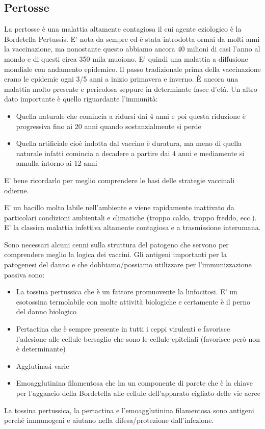 \subsection{Pertosse}

  La pertosse è una malattia altamente contagiosa il cui agente
  eziologico è la Bordetella Pertussis. E' nota da sempre ed è stata
  introdotta ormai da molti anni la vaccinazione, ma nonostante questo
  abbiamo ancora 40 milioni di casi l'anno al mondo e di questi circa
  350 mila muoiono. E' quindi una malattia a diffusione mondiale con
  andamento epidemico. Il passo tradizionale prima della vaccinazione
  erano le epidemie ogni 3/5 anni a inizio primavera e inverno. È ancora
  una malattia molto presente e pericolosa seppure in determinate fasce
  d'età. Un altro dato importante è quello riguardante l'immunità:

\begin{itemize}
\item
  Quella naturale che comincia a ridursi dai 4 anni e poi questa
  riduzione è progressiva fino ai 20 anni quando sostanzialmente si
  perde
\item
  Quella artificiale cioè indotta dal vaccino è duratura, ma meno di
  quella naturale infatti comincia a decadere a partire dai 4 anni e
  mediamente si annulla intorno ai 12 anni
\end{itemize}
  E' bene ricordarlo per meglio comprendere le basi delle strategie
  vaccinali odierne.

  E' un bacillo molto labile nell'ambiente e viene rapidamente
  inattivato da particolari condizioni ambientali e climatiche (troppo
  caldo, troppo freddo, ecc.). E' la classica malattia infettiva
  altamente contagiosa e a trasmissione interumana.

  Sono necessari alcuni cenni sulla struttura del patogeno che servono
  per comprendere meglio la logica dei vaccini. Gli antigeni importanti
  per la patogenesi del danno e che dobbiamo/possiamo utilizzare per
  l'immunizzazione passiva sono:

\begin{itemize}
\item
  La tossina pertussica che è un fattore promuovente la linfocitosi. E'
  un esotossina termolabile con molte attività biologiche e certamente è
  il perno del danno biologico
\item
  Pertactina che è sempre presente in tutti i ceppi virulenti e
  favorisce l'adesione alle cellule bersaglio che sono le cellule
  epiteliali (favorisce però non è determinante)
\item
  Agglutinasi varie
\item
  Emoagglutinina filamentosa che ha un componente di parete che è la
  chiave per l'aggancio della Bordetella alle cellule dell'apparato
  cigliato delle vie aeree
\end{itemize}
  La tossina pertussica, la pertactina e l'emoagglutinina filamentosa
  sono antigeni perché immunogeni e aiutano nella difesa/protezione
  dall'infezione.

